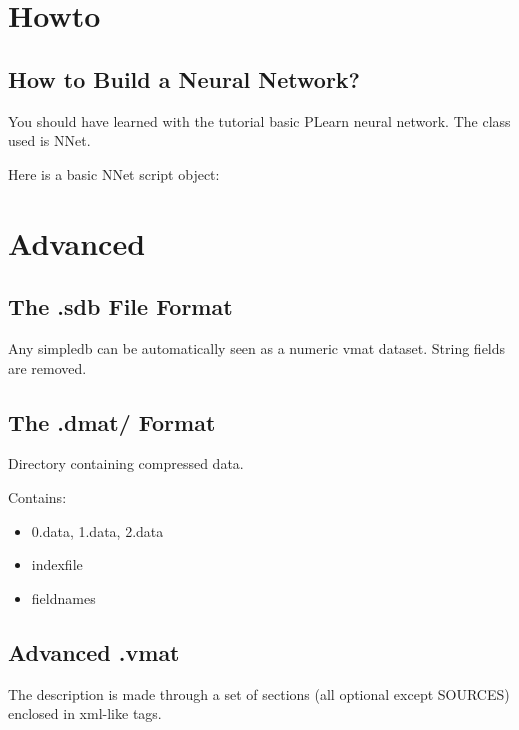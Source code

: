 \documentclass[11pt]{book}
\begin{document}
\chapter{Howto}

\section{How to Build a Neural Network?}

You should have learned with the tutorial basic PLearn neural network. The class used is NNet.

Here is a basic NNet script object:




\chapter{Advanced}

\section{The .sdb File Format}

Any simpledb can be automatically seen as a numeric vmat dataset. 
String fields are removed.

\section{The .dmat/ Format }

Directory containing compressed data.

Contains:
\begin{itemize}
\item 0.data, 1.data, 2.data
\item indexfile
\item fieldnames
\end{itemize}

\section{Advanced .vmat}

The description is made through a set of sections (all optional except SOURCES) enclosed in xml-like tags.
\end{document}
